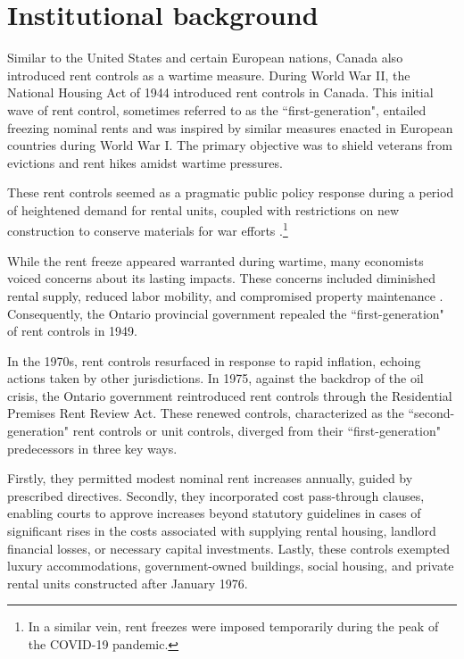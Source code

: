 \documentclass[parskip=full]{article}
\begin{document}
\section{Institutional background}\label{sec:insitutional_background}

Similar to the United States and certain European nations, Canada also introduced rent controls as a wartime measure. During World War II, the National Housing Act of 1944 introduced rent controls in Canada. This initial wave of rent control, sometimes referred to as the ``first-generation", entailed freezing nominal rents and was inspired by similar measures enacted in European countries during World War I. The primary objective was to shield veterans from evictions and rent hikes amidst wartime pressures.

These rent controls seemed as a pragmatic public policy response during a period of heightened demand for rental units, coupled with restrictions on new construction to conserve materials for war efforts \citep{downs-1988}.\footnote{In a similar vein, rent freezes were imposed temporarily during the peak of the COVID-19 pandemic.}

While the rent freeze appeared warranted during wartime, many economists voiced concerns about its lasting impacts. These concerns included diminished rental supply, reduced labor mobility, and compromised property maintenance \citep{arnott-1995}. Consequently, the Ontario provincial government repealed the ``first-generation" of rent controls in 1949.

In the 1970s, rent controls resurfaced in response to rapid inflation, echoing actions taken by other jurisdictions. In 1975, against the backdrop of the oil crisis, the Ontario government reintroduced rent controls through the Residential Premises Rent Review Act. These renewed controls, characterized as the ``second-generation" rent controls or unit controls, diverged from their ``first-generation" predecessors in three key ways.

Firstly, they permitted modest nominal rent increases annually, guided by prescribed directives. Secondly, they incorporated cost pass-through clauses, enabling courts to approve increases beyond statutory guidelines in cases of significant rises in the costs associated with supplying rental housing, landlord financial losses, or necessary capital investments. Lastly, these controls exempted luxury accommodations, government-owned buildings, social housing, and private rental units constructed after January 1976.
\end{document}
